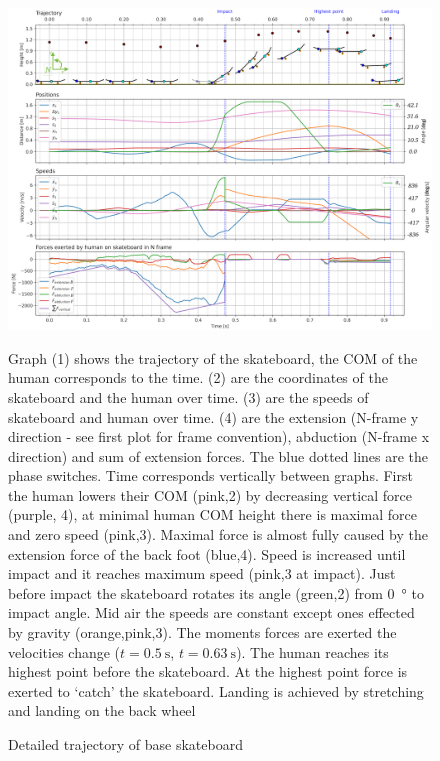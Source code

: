 \documentclass[default,iicol]{sn-jnl}
\begin{document}
\begin{figure}
    \centering
    \includegraphics[trim={0cm 0cm 0cm 0cm},clip,width=\textwidth]{paper/figure/Results/data_basedpi600 (1).png}
    \caption[Trajectory, positions, speeds, and forces of base optimization]{\foot
    Detailed trajectory of base skateboard}\label{f_noparameter}
    Graph (1) shows the trajectory of the skateboard, the COM of the human corresponds to the time. (2) are the coordinates of the skateboard and the human over time. (3) are the speeds of skateboard and human over time. (4) are the extension (N-frame y direction - see first plot for frame convention), abduction (N-frame x direction) and sum of extension forces. The blue dotted lines are the phase switches. Time corresponds vertically between graphs. First the human lowers their COM (pink,2) by decreasing vertical force (purple, 4), at minimal human COM height there is maximal force and zero speed (pink,3). Maximal force is almost fully caused by the extension force of the back foot (blue,4). Speed is increased until impact and it reaches maximum speed (pink,3 at impact). Just before impact the skateboard rotates its angle (green,2) from \SI{0}{\degree} to impact angle. Mid air the speeds are constant except ones effected by gravity (orange,pink,3). The moments forces are exerted the velocities change ($t=\SI{0.5}{\second}$, $t=\SI{0.63}{\second}$). The human reaches its highest point before the skateboard. At the highest point force is exerted to `catch' the skateboard. Landing is achieved by stretching and landing on the back wheel
\end{figure}
\end{document}
